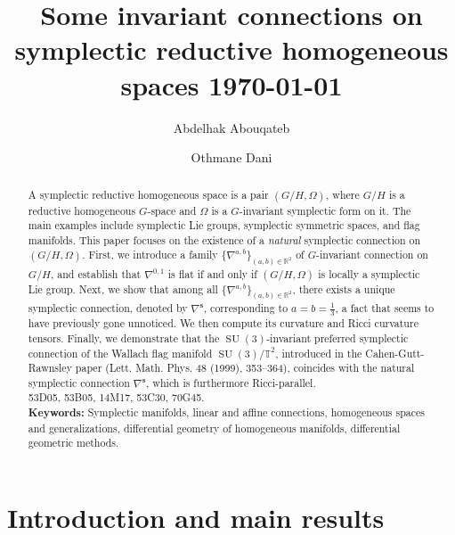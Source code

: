 \documentclass[preprint,12pt,1p]{elsarticle}
\theoremstyle{plain}
\theoremstyle{definition}
\newcommand{\rel}{\mathbb{R}}
\newcommand{\n}{\nabla}
\newcommand{\ns}{\n^\mathbf{s}}
\numberwithin{equation}{section}
\newcommand{\SU}{\operatorname{SU}}
\newcommand{\nab}{\n^{a,b}}
\newcommand{\ab}{(a,b)}
\begin{document}
\begin{frontmatter}

\title{\textbf{Some invariant connections on symplectic reductive homogeneous spaces}\vskip 0.5cm \today}

\author[l1]{Abdelhak Abouqateb}
\author[l1]{Othmane Dani}
\address[l1]{Department of Mathematics, Faculty of Sciences and Technologies, Cadi Ayyad University  B.P.549 Gueliz Marrakesh, Morocco}
	
\begin{abstract}
A symplectic reductive homogeneous space is a pair $(G/H,\Omega)$, where $G/H$ is a reductive homogeneous $G$-space and $\Omega$ is a $G$-invariant symplectic form on it. The main examples include symplectic Lie groups, symplectic symmetric spaces, and flag manifolds. This paper focuses on the existence of a \textit{natural} symplectic connection on $(G/H,\Omega)$. First, we introduce a family $\{\nab\}_{\ab\in\rel^2}$ of $G$-invariant connection on $G/H$, and establish that $\n^{0,1}$ is flat if and only if $(G/H,\Omega)$ is locally a symplectic Lie group. Next, we show that among all $\{\nab\}_{\ab\in\rel^2}$, there exists a unique symplectic connection, denoted by $\ns$, corresponding to $a=b=\tfrac{1}{3}$, a fact that seems to have previously gone unnoticed. We then compute its curvature and Ricci curvature tensors. Finally, we demonstrate that the $\SU(3)$-invariant preferred symplectic connection of the Wallach flag manifold $\SU(3)/\mathbb{T}^2$, introduced in the Cahen-Gutt-Rawnsley paper \cite{Cah1} (Lett. Math. Phys. 48 (1999), 353–364), coincides with the natural symplectic connection $\ns$, which is furthermore Ricci-parallel.\\
 53D05, 53B05, 14M17, 53C30, 70G45. \\
{\bf Keywords:}  Symplectic manifolds, linear and affine connections, homogeneous spaces and generalizations, differential geometry of homogeneous manifolds, differential geometric methods.
\end{abstract}

\end{frontmatter}	
	
\section{Introduction and main results}
\end{document}
